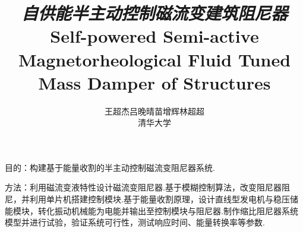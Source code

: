 \documentclass[12pt]{article}
\begin{document}
\title{ \textbf{\emph{自供能半主动控制磁流变建筑阻尼器}}\\
	 Self-powered Semi-active Magnetorheological Fluid Tuned Mass Damper of Structures}
\date{}
\author{王超杰\quad 吕晚晴\quad 苗增辉\quad 林超超 \\清华大学}

\maketitle

\abstract
目的：构建基于能量收割的半主动控制磁流变阻尼器系统.

方法：利用磁流变液特性设计磁流变阻尼器.基于模糊控制算法，改变阻尼器阻尼，并利用单片机搭建控制模块.基于能量收割原理，设计直线型发电机与稳压储能模块，转化振动机械能为电能并输出至控制模块与阻尼器.制作缩比阻尼器系统模型并进行试验，验证系统可行性，测试响应时间、能量转换率等参数.

\thispagestyle{empty}
\newpage
\tableofcontents
\thispagestyle{empty}
\newpage
\setcounter{page}{1}












\end{document}
